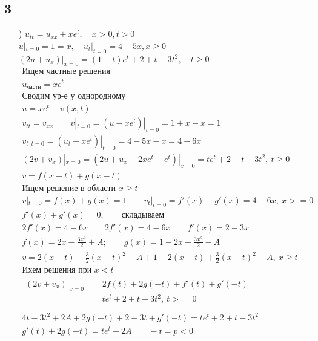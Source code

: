\subsection{3}
\begin{enumerate}
  \item[\text{б})] $u_{tt} = u_{xx} +xe^{t}, \quad x>0,t>0$ \\
$u|_{t=0} = 1=x, \quad u_{t}|_{t=0} = 4-5x, x \geq 0$ \\
$(2u+u_{x})|_{x=0}=(1+t)e^{t}+2+t-3t^{2}, \quad t \geq 0$ \\
\begin{gather*}
  \text{Ищем частные решения} \\
  u_{\text{частн}} = xe^{t} \\
  \text{Сводим ур-е у однородному} \\
  u = xe^{t} + v(x,t) \\
  v_{tt} = v_{xx} \qquad v|_{t=0} = (u - xe^{t})|_{t=0} = 1+x-x=1 \\
  v_{t}|_{t=0}=(u_{t}-xe^{t})|_{t=0}=4-5x-x=4-6x \\
  (2v+v_{x})|_{x=0} = (2u+u_{x}-2xe^{t}-e^{t})|_{x=0} = te^{t}+2+t-3t^{2}, \ t \geq 0 \\
v = f(x+t) + g(x-t) \\
\text{Ищем решение в области $x \geq t$} \\
v|_{t=0} = f(x)+g(x) = 1 \qquad v_{t}|_{t=0} = f'(x) - g'(x) = 4 - 6x, \ x>= 0 \\
f'(x) + g'(x) = 0, \qquad \text{складываем} \\
2f'(x)=4-6x \qquad 2f'(x) = 4-6x \qquad f'(x) = 2-3x \\
\boxed{f(x)=2x -\frac{3x^{2}}{2}+A; \qquad g(x) = 1-2x+ \frac{3x^{2}}{2}-A} \\
v = 2(x+t) - \frac{3}{2}(x+t)^{2}+A+1-2(x-t)+ \frac{3}{2}(x-t)^{2}-A, \ x \geq t \\
\text{Ихем решения при $x < t$} \\
\begin{split}
  (2v+v_{x})|_{x=0} &= 2f(t)+2g(-t)+ f'(t) + g'(-t) = \\
                    &= te^{t} +2+t -3t^{2}, \ t>= 0 \\
\end{split} \\
4t-3t^{2}+2A+2g(-t)+2-3t+g'(-t) = te^{t}+2+t-3t^{2} \\
g'(t)+2g(-t)=te^{t}-2A \qquad -t = p < 0 \\
\end{gather*}
\begin{gather*}

\end{gather*}
\end{enumerate}
